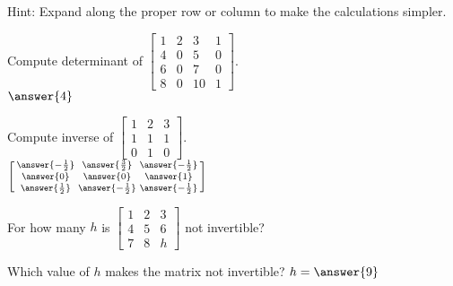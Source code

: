 \documentclass{ximera}
\begin{document}
\begin{exercise}
    \begin{hint}
        Hint: Expand along the proper row or column to make the calculations simpler.\\
    \end{hint}
    Compute determinant of
    $\left[ 
        \begin{smallmatrix}
            1 & 2 & 3 & 1 \\
            4 & 0 & 5 & 0 \\
            6 & 0 & 7 & 0 \\
            8 & 0 & 10 & 1
        \end{smallmatrix} 
    \right]$.\\
    $\answer{4}$
\end{exercise}

\begin{exercise}
    Compute inverse of
    $\left[ 
        \begin{smallmatrix}
            1 & 2 & 3 \\
            1 & 1 & 1 \\
            0 & 1 & 0
        \end{smallmatrix} 
    \right]$.\\
    $\left[\begin{smallmatrix} \answer{-\frac{1}{2}} & \answer{\frac{3}{2}} & \answer{-\frac{1}{2}} \\ \answer{0} & \answer{0} & \answer{1} \\ \answer{\frac{1}{2}} & \answer{-\frac{1}{2}} & \answer{-\frac{1}{2}} \end{smallmatrix}\right]$
\end{exercise}

\begin{exercise}
    For how many $h$ is
    $\left[ 
        \begin{smallmatrix}
            1 & 2 & 3 \\
            4 & 5 & 6 \\
            7 & 8 & h
        \end{smallmatrix} 
    \right]$
    not invertible? 
    \begin{multipleChoice}
    \end{multipleChoice}
    \begin{problem}
        Which value of $h$ makes the matrix not invertible? $h = \answer{9}$ 
    \end{problem}
\end{exercise}
\end{document}

